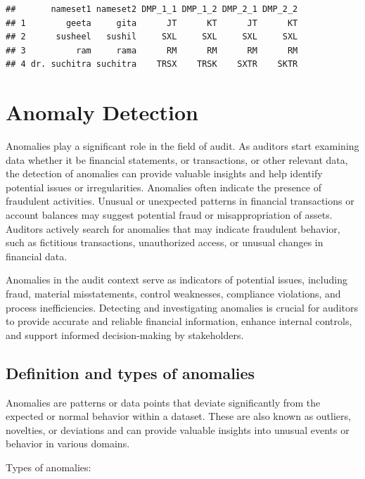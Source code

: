 \documentclass[
]{book}
\begin{document}
\begin{verbatim}
##       nameset1 nameset2 DMP_1_1 DMP_1_2 DMP_2_1 DMP_2_2
## 1        geeta     gita      JT      KT      JT      KT
## 2      susheel   sushil     SXL     SXL     SXL     SXL
## 3          ram     rama      RM      RM      RM      RM
## 4 dr. suchitra suchitra    TRSX    TRSK    SXTR    SKTR
\end{verbatim}

\hypertarget{anomaly-detection}{%
\chapter{Anomaly Detection}\label{anomaly-detection}}

Anomalies play a significant role in the field of audit. As auditors start examining data whether it be financial statements, or transactions, or other relevant data, the detection of anomalies can provide valuable insights and help identify potential issues or irregularities. Anomalies often indicate the presence of fraudulent activities. Unusual or unexpected patterns in financial transactions or account balances may suggest potential fraud or misappropriation of assets. Auditors actively search for anomalies that may indicate fraudulent behavior, such as fictitious transactions, unauthorized access, or unusual changes in financial data.

Anomalies in the audit context serve as indicators of potential issues, including fraud, material misstatements, control weaknesses, compliance violations, and process inefficiencies. Detecting and investigating anomalies is crucial for auditors to provide accurate and reliable financial information, enhance internal controls, and support informed decision-making by stakeholders.

\hypertarget{definition-and-types-of-anomalies}{%
\section{Definition and types of anomalies}\label{definition-and-types-of-anomalies}}

Anomalies are patterns or data points that deviate significantly from the expected or normal behavior within a dataset. These are also known as outliers, novelties, or deviations and can provide valuable insights into unusual events or behavior in various domains.

Types of anomalies:
\end{document}
